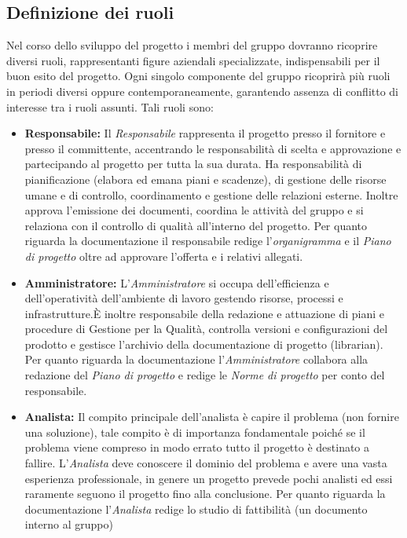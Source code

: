 \documentclass[a4paper]{article}
\begin{document}
\begin{appendices}
		\subsection{Definizione dei ruoli}
			Nel corso dello sviluppo del progetto i membri del gruppo dovranno ricoprire diversi ruoli, rappresentanti 
			figure aziendali specializzate, indispensabili per il buon esito del progetto. Ogni singolo componente del 
			gruppo ricoprirà più ruoli in periodi diversi oppure contemporaneamente, garantendo assenza di conflitto di 
			interesse tra i ruoli assunti.
			Tali ruoli sono:
			\begin{itemize}
				\item \textbf{Responsabile:} Il \emph{Responsabile} rappresenta il progetto presso il fornitore e presso 
				il committente, accentrando le responsabilità di scelta e approvazione e partecipando al progetto per tutta 
				la sua durata. Ha responsabilità di pianificazione (elabora ed emana piani e scadenze), di gestione delle 
				risorse umane e di controllo, coordinamento e gestione delle relazioni esterne. Inoltre approva l'emissione 
				dei documenti, coordina le attività del gruppo e si relaziona con il controllo di qualità all'interno del 
				progetto. Per quanto riguarda la documentazione il responsabile redige l'\emph{organigramma} e il 
				\emph{Piano di progetto} oltre ad approvare l'offerta e i relativi allegati.
				\item \textbf{Amministratore:} L'\emph{Amministratore} si occupa dell'efficienza e dell'operatività dell'ambiente 
				di lavoro gestendo risorse, processi e infrastrutture.È inoltre responsabile della redazione e attuazione di piani 
				e procedure di Gestione per la Qualità, controlla versioni e configurazioni del prodotto e gestisce l'archivio 
				della documentazione di progetto (librarian). Per quanto riguarda la documentazione l'\emph{Amministratore} 
				collabora alla redazione del \emph{Piano di progetto} e redige le \emph{Norme di progetto} per conto del responsabile.
				\item \textbf{Analista:} Il compito principale dell'analista è capire il problema (non fornire una soluzione),
				tale compito è di importanza fondamentale poiché se il problema viene compreso in modo errato tutto il progetto 
				è destinato a fallire. L'\emph{Analista} deve conoscere il dominio del problema e avere una vasta esperienza professionale, 
				in genere un progetto prevede pochi analisti ed essi raramente seguono il progetto fino alla conclusione. Per 
				quanto riguarda la documentazione l'\emph{Analista} redige lo studio di fattibilità (un documento interno al gruppo) 

\end{itemize}
\end{appendices}
\end{document}

